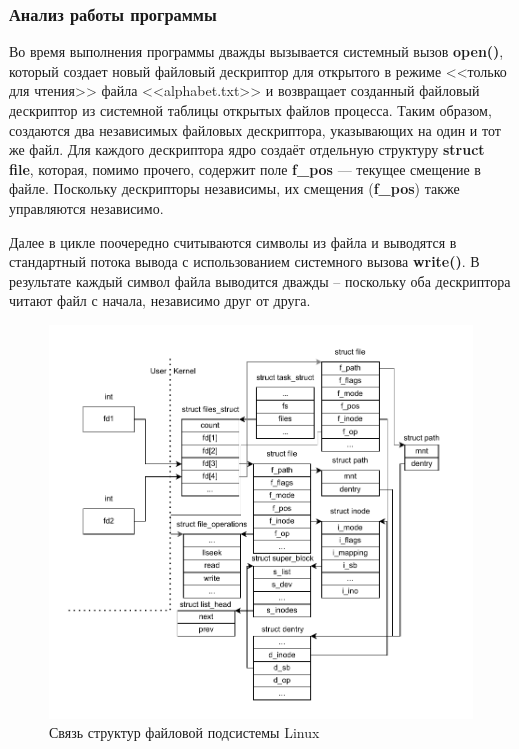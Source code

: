 \subsubsection*{Анализ работы программы}

Во время выполнения программы дважды вызывается системный вызов \textbf{open()}, который создает новый файловый дескриптор для открытого в режиме <<только для чтения>> файла <<alphabet.txt>> и возвращает созданный файловый дескриптор из системной таблицы открытых файлов процесса. Таким образом, создаются два независимых файловых дескриптора, указывающих на один и тот же файл. Для каждого дескриптора ядро создаёт отдельную структуру \textbf{struct file}, которая, помимо прочего, содержит поле \textbf{f\_pos} — текущее смещение в файле. Поскольку дескрипторы независимы, их смещения (\textbf{f\_pos}) также управляются независимо.

Далее в цикле поочередно считываются символы из файла и выводятся в стандартный потока вывода с использованием системного вызова \textbf{write()}. В результате каждый символ файла выводится дважды -- поскольку оба дескриптора читают файл с начала, независимо друг от друга.

\begin{figure}[h!] 
	\centering
	\includegraphics[width=1.03\textwidth]{./img/second.pdf}
	\caption{Связь структур файловой подсистемы Linux}
	\label{fig:33}
\end{figure}
\newpage

